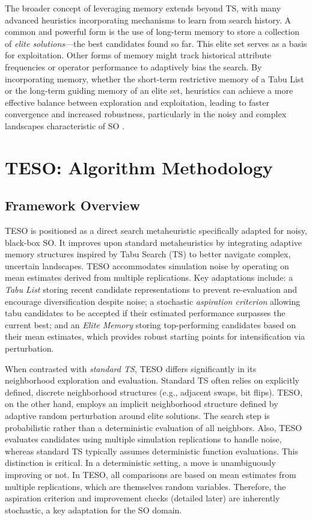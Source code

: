 \documentclass{article}
\begin{document}
The broader concept of leveraging memory extends beyond TS, with many advanced heuristics incorporating mechanisms to learn from search history. A common and powerful form is the use of long-term memory to store a collection of \textit{elite solutions}—the best candidates found so far. This elite set serves as a basis for exploitation. Other forms of memory might track historical attribute frequencies or operator performance to adaptively bias the search. By incorporating memory, whether the short-term restrictive memory of a Tabu List or the long-term guiding memory of an elite set, heuristics can achieve a more effective balance between exploration and exploitation, leading to faster convergence and increased robustness, particularly in the noisy and complex landscapes characteristic of SO \cite{yu2023optimal}. 






\section{TESO: Algorithm Methodology}
\label{sec:methodology}


\subsection{Framework Overview}
\label{subsec:framework_overview}

TESO is positioned as a direct search metaheuristic specifically adapted for noisy, black-box SO. It improves upon standard metaheuristics by integrating adaptive memory structures inspired by Tabu Search (TS) to better navigate complex, uncertain landscapes. TESO accommodates simulation noise by operating on mean estimates derived from multiple replications. Key adaptations include: a \textit{Tabu List} storing recent candidate representations to prevent re-evaluation and encourage diversification despite noise; a stochastic \textit{aspiration criterion} allowing tabu candidates to be accepted if their estimated performance surpasses the current best; and an \textit{Elite Memory} storing top-performing candidates based on their mean estimates, which provides robust starting points for intensification via perturbation.

When contrasted with \textit{standard TS}, TESO differs significantly in its neighborhood exploration and evaluation. Standard TS often relies on explicitly defined, discrete neighborhood structures (e.g., adjacent swaps, bit flips). TESO, on the other hand, employs an implicit neighborhood structure defined by adaptive random perturbation around elite solutions. The search step is probabilistic rather than a deterministic evaluation of all neighbors. Also, TESO evaluates candidates using multiple simulation replications to handle noise, whereas standard TS typically assumes deterministic function evaluations. This distinction is critical. In a deterministic setting, a move is unambiguously improving or not. In TESO, all comparisons are based on mean estimates from multiple replications, which are themselves random variables. Therefore, the aspiration criterion and improvement checks (detailed later) are inherently stochastic, a key adaptation for the SO domain.
\end{document}
